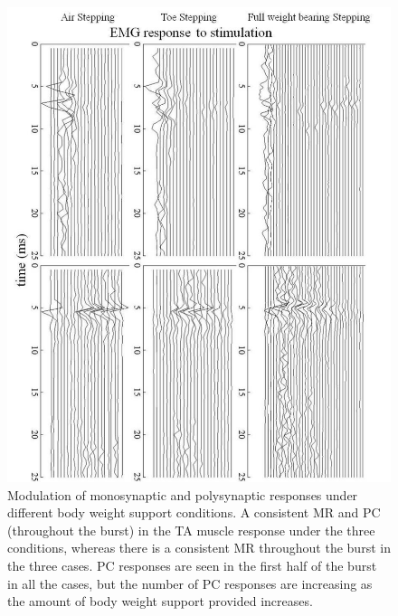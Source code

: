 \documentclass[]{elsarticle}
\begin{document}
\begin{figure}[ht!]
	\centering
	\includegraphics[width=1\textwidth]{new_pic/pic3.png}
	\caption{
    Modulation of monosynaptic and polysynaptic responses under different body weight support conditions. A consistent MR and PC (throughout the burst) in the TA muscle response under the three conditions, whereas there is a consistent MR throughout the burst in the three cases. PC responses are seen in the first half of the burst in all the cases, but the number of PC responses are increasing as the amount of body weight support provided increases. 
    }
    \label{fig:lavrov_updates3}
\end{figure}

\begin{figure}[ht!]
	\centering
	\caption{
    }
    \label{fig:lavrov_updates4}
\end{figure}

\newpage



\end{document}
